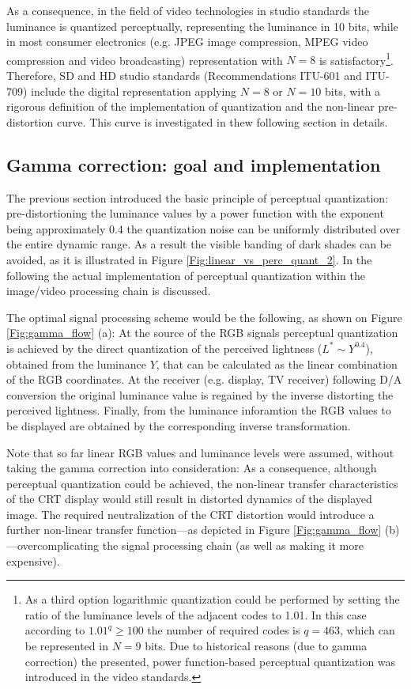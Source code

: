As a consequence, in the field of video technologies in studio standards the luminance is quantized perceptually, representing the luminance in 10 bits, while in most consumer electronics (e.g. JPEG image compression, MPEG video compression and video broadcasting) representation with $N=8$ is satisfactory\footnote{
As a third option logarithmic quantization could be performed by setting the ratio of the luminance levels of the adjacent codes to 1.01.
In this case according to $1.01^q \geq 100$ the number of required codes is $q = 463$, which can be represented in $N = 9$ bits.
Due to historical reasons (due to gamma correction) the presented, power function-based perceptual quantization was introduced in the video standards.}.
Therefore, SD and HD studio standards (Recommendations ITU-601 and ITU-709) include the digital representation applying $N = 8$ or $N = 10$ bits, with a rigorous definition of the implementation of quantization and the non-linear pre-distortion curve.
This curve is investigated in thew following section in details.

\subsection{Gamma correction: goal and implementation}
The previous section introduced the basic principle of perceptual quantization: pre-distortioning the luminance values by a power function with the exponent being approximately 0.4 the quantization noise can be uniformly distributed over the entire dynamic range.
As a result the visible banding of dark shades can be avoided, as it is illustrated in Figure \ref{Fig:linear_vs_perc_quant_2}.
In the following the actual implementation of perceptual quantization within the image/video processing chain is discussed.

The optimal signal processing scheme would be the following, as shown on Figure \ref{Fig:gamma_flow} (a):
At the source of the RGB signals perceptual quantization is achieved by the direct quantization of the perceived lightness ($L^* \sim Y^{0.4}$), obtained from the luminance $Y$, that can be calculated as the linear combination of the RGB coordinates.
At the receiver (e.g. display, TV receiver) following D/A conversion the original luminance value is regained by the inverse distorting the perceived lightness.
Finally, from the luminance inforamtion the RGB values to be displayed are obtained by the corresponding inverse transformation.

Note that so far linear RGB values and luminance levels were assumed, without taking the gamma correction into consideration:
As a consequence, although perceptual quantization could be achieved, the non-linear transfer characteristics of the CRT display would still result in distorted dynamics of the displayed image.
The required neutralization of the CRT distortion would introduce a further non-linear transfer function---as depicted in Figure \ref{Fig:gamma_flow} (b)---overcomplicating the signal processing chain (as well as making it more expensive).

